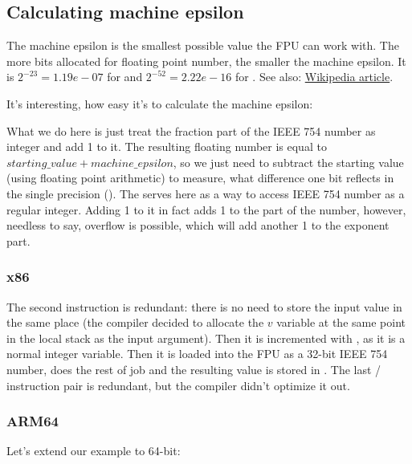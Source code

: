 ﻿\subsection{Calculating machine epsilon}

The machine epsilon is the smallest possible value the \ac{FPU} can work with.
The more bits allocated for floating point number, the smaller the machine epsilon.
It is $2^{-23} = 1.19e-07$ for \Tfloat and $2^{-52} = 2.22e-16$ for \Tdouble.
See also: \href{http://link.yurichev.com/17367}{Wikipedia article}.%

It's interesting, how easy it's to calculate the machine epsilon:



What we do here is just treat the fraction part of the IEEE 754 number as integer and add 1 to it.
The resulting floating number is equal to $starting\_value+machine\_epsilon$, so we just need to subtract
the starting value (using floating point arithmetic) to measure, what difference one bit reflects
in the single precision (\Tfloat).
The  serves here as a way to access IEEE 754 number as a regular integer.
Adding 1 to it in fact adds 1 to the  part of the number, however, needless to say,
overflow is possible, which will add another 1 to the exponent part.

\subsubsection{x86}



The second  instruction is redundant: there is no need to store the input value in the same
place (the compiler decided to allocate the $v$ variable at the same point in the local stack as the input 
argument).
Then it is incremented with , as it is a normal integer variable.
Then it is loaded into the FPU as a 32-bit IEEE 754 number,  does the rest of job and the resulting
value is stored in .
The last / instruction pair is redundant, but the compiler didn't optimize it out.

\subsubsection{ARM64}

Let's extend our example to 64-bit:

